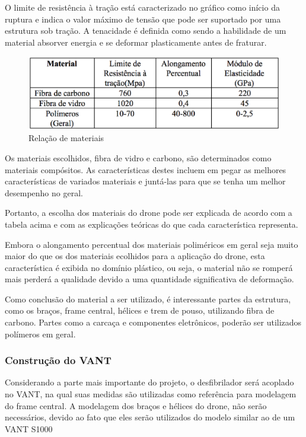 O limite de resistência à tração está caracterizado no gráfico como início da ruptura e indica o valor máximo de tensão que pode ser suportado por uma estrutura sob tração.
A tenacidade é definida como sendo a habilidade de um material absorver energia e se deformar plasticamente antes de fraturar.

\begin{figure}[h]
    \centering
      \includegraphics[keepaspectratio=true,scale=0.7]{figuras/graficoRelacao.eps}
    \caption{ Relação de materiais}
    \label{fig:graficoRelacao}
\end{figure}

Os materiais escolhidos, fibra de vidro e carbono, são determinados como materiais compósitos.
As características destes incluem em pegar as melhores características de variados materiais e juntá-las para que se tenha um 
melhor desempenho no geral. 

Portanto, a escolha dos materiais do drone pode ser explicada de acordo com a tabela acima e com as explicações teóricas do que cada característica representa. 

Embora o alongamento percentual dos materiais poliméricos em geral seja muito maior do que os dos materiais ecolhidos para a aplicação do drone, esta característica é exibida no domínio plástico, ou seja, o material não se romperá mais perderá a qualidade devido a uma quantidade significativa de deformação.

Como conclusão do material a ser utilizado, é interessante partes da estrutura, como os braços, frame central, hélices e trem de pouso, utilizando fibra de carbono. Partes como a carcaça e componentes eletrônicos, poderão ser utilizados polímeros em geral. 

\subsubsection{Construção do VANT}

Considerando a parte mais importante do projeto, o desfibrilador será acoplado no VANT, na qual suas medidas são utilizadas como referência para modelagem do frame central.  A modelagem dos braços e hélices do drone,  não serão necessários, devido ao fato que eles serão utilizados do modelo similar ao de um VANT S1000


